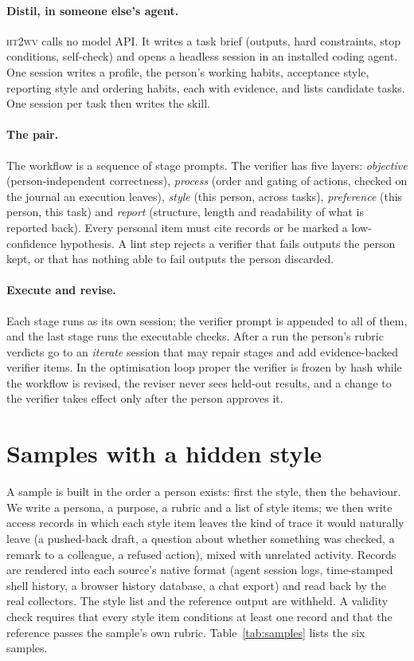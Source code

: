 \documentclass[10pt]{article}
\newcommand{\sys}{\textsc{ht2wv}}
\begin{document}
\paragraph{Distil, in someone else's agent.} \sys{} calls no model API. It writes a task brief (outputs, hard
constraints, stop conditions, self-check) and opens a headless session in an installed coding agent. One session
writes a profile, the person's working habits, acceptance style, reporting style and ordering habits, each with
evidence, and lists candidate tasks. One session per task then writes the skill.

\paragraph{The pair.} The workflow is a sequence of stage prompts. The verifier has five layers:
\emph{objective} (person-independent correctness), \emph{process} (order and gating of actions, checked on the
journal an execution leaves), \emph{style} (this person, across tasks), \emph{preference} (this person, this task)
and \emph{report} (structure, length and readability of what is reported back). Every personal item must cite
records or be marked a low-confidence hypothesis. A lint step rejects a verifier that fails outputs the person
kept, or that has nothing able to fail outputs the person discarded.

\paragraph{Execute and revise.} Each stage runs as its own session; the verifier prompt is appended to all of
them, and the last stage runs the executable checks. After a run the person's rubric verdicts go to an
\emph{iterate} session that may repair stages and add evidence-backed verifier items. In the optimisation loop
proper the verifier is frozen by hash while the workflow is revised, the reviser never sees held-out results, and
a change to the verifier takes effect only after the person approves it.

\section{Samples with a hidden style}
\label{sec:bench}

A sample is built in the order a person exists: first the style, then the behaviour. We write a persona, a
purpose, a rubric and a list of style items; we then write access records in which each style item leaves the
kind of trace it would naturally leave (a pushed-back draft, a question about whether something was checked, a
remark to a colleague, a refused action), mixed with unrelated activity. Records are rendered into each source's
native format (agent session logs, time-stamped shell history, a browser history database, a chat export) and
read back by the real collectors. The style list and the reference output are withheld. A validity check requires
that every style item conditions at least one record and that the reference passes the sample's own rubric.
Table~\ref{tab:samples} lists the six samples.
\end{document}
